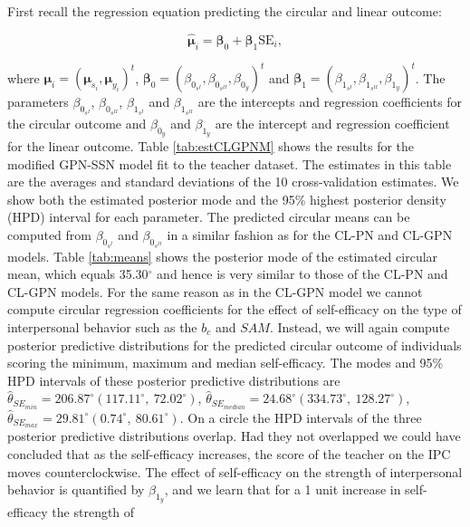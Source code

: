 \documentclass[12pt,]{article}
\begin{document}
First recall the regression equation predicting the circular and linear
outcome:

\[\hat{\boldsymbol{\mu}}_{i} = \boldsymbol{\beta}_0 +\boldsymbol{\beta}_1\text{SE}_i,\]

\noindent where
\(\boldsymbol{\mu}_i = (\boldsymbol{\mu}_{s_i}, \boldsymbol{\mu}_{y_i})^t\),
\(\boldsymbol{\beta}_0 = (\beta_{0_{s^{I}}}, \beta_{0_{s^{II}}},\beta_{0_y})^t\)
and
\(\boldsymbol{\beta}_1 = (\beta_{1_{s^{I}}}, \beta_{1_{s^{II}}},\beta_{1_y})^t\).
The parameters \(\beta_{0_{s^{I}}}\), \(\beta_{0_{s^{II}}}\),
\(\beta_{1_{s^{I}}}\) and \(\beta_{1_{s^{II}}}\) are the intercepts and
regression coefficients for the circular outcome and \(\beta_{0_y}\) and
\(\beta_{1_y}\) are the intercept and regression coefficient for the
linear outcome.\newline
\indent Table \ref{tab:estCLGPNM} shows the results for the modified
GPN-SSN model fit to the teacher dataset. The estimates in this table
are the averages and standard deviations of the 10 cross-validation
estimates. We show both the estimated posterior mode and the 95\%
highest posterior density (HPD) interval for each parameter. The
predicted circular means can be computed from \(\beta_{0_{s^{I}}}\) and
\(\beta_{0_{s^{II}}}\) in a similar fashion as for the CL-PN and CL-GPN
models. Table \ref{tab:means} shows the posterior mode of the estimated
circular mean, which equals 35.30\(^\circ\) and hence is very similar to
those of the CL-PN and CL-GPN models.\newline
\indent For the same reason as in the CL-GPN model we cannot compute
circular regression coefficients for the effect of self-efficacy on the
type of interpersonal behavior such as the \(b_c\) and \(SAM\). Instead,
we will again compute posterior predictive distributions for the
predicted circular outcome of individuals scoring the minimum, maximum
and median self-efficacy. The modes and 95\% HPD intervals of these
posterior predictive distributions are
\(\hat{\theta}_{SE_{min}} = 206.87^\circ (117.11^\circ, \: 72.02^\circ)\),
\(\hat{\theta}_{SE_{median}} = 24.68^\circ (334.73^\circ, \: 128.27^\circ)\),
\(\hat{\theta}_{SE_{max}} = 29.81^\circ (0.74^\circ, \: 80.61^\circ)\).
On a circle the HPD intervals of the three posterior predictive
distributions overlap. Had they not overlapped we could have concluded
that as the self-efficacy increases, the score of the teacher on the IPC
moves counterclockwise. The effect of self-efficacy on the strength of
interpersonal behavior is quantified by \(\beta_{1_y}\), and we learn
that for a 1 unit increase in self-efficacy the strength of
\end{document}
